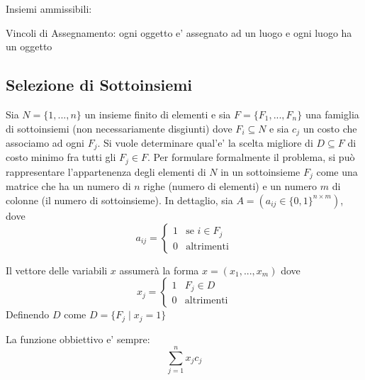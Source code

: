Insiemi ammissibili:

Vincoli di Assegnamento: ogni oggetto e' assegnato ad un luogo e ogni luogo ha un oggetto

\subsection{Selezione di Sottoinsiemi}

Sia $ N = \{1,...,n\} $ un insieme finito di elementi e sia $ F = \{F_1,...,F_n\} $ una famiglia di sottoinsiemi (non necessariamente disgiunti) dove $F_i \subseteq N$ e sia $c_j$ un costo che associamo ad ogni $F_j$. Si vuole determinare qual'e' la scelta migliore di $ D\subseteq F $ di costo minimo fra tutti gli $F_j\in F$. Per formulare formalmente il problema, si può rappresentare l'appartenenza degli elementi di $ N $ in un sottoinsieme $ F_j $ come una matrice che ha un numero di $n$ righe (numero di elementi) e un numero $m$ di colonne (il numero di sottoinsieme). In dettaglio, sia $A=(a_{ij}\in\{0,1\}^{n\times m})$, dove
\[
  a_{ij} = \begin{cases}
    1 & \text{se } i \in F_j\\
    0 & \text{altrimenti}
  \end{cases}
\]

Il vettore delle variabili $ x $ assumerà la forma $ x = (x_1,...,x_m) $ dove
\[
  x_j = \begin{cases}
  1 & F_j \in D\\
  0 & \text{altrimenti}
  \end{cases}
\]
Definendo $D$ come $D = \{F_j \mid x_j = 1\}$

La funzione obbiettivo e' sempre:
\[
\sum_{j=1}^{n} x_j c_j
\]

